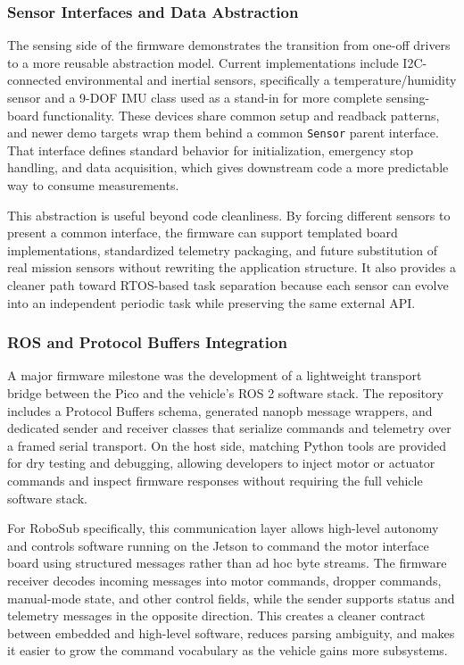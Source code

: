 \documentclass[conference]{IEEEtran}
\begin{document}
\subsubsection{Sensor Interfaces and Data Abstraction}

The sensing side of the firmware demonstrates the transition from one-off drivers to a more reusable abstraction model. Current implementations include I2C-connected environmental and inertial sensors, specifically a temperature/humidity sensor and a 9-DOF IMU class used as a stand-in for more complete sensing-board functionality. These devices share common setup and readback patterns, and newer demo targets wrap them behind a common \texttt{Sensor} parent interface. That interface defines standard behavior for initialization, emergency stop handling, and data acquisition, which gives downstream code a more predictable way to consume measurements.

This abstraction is useful beyond code cleanliness. By forcing different sensors to present a common interface, the firmware can support templated board implementations, standardized telemetry packaging, and future substitution of real mission sensors without rewriting the application structure. It also provides a cleaner path toward RTOS-based task separation because each sensor can evolve into an independent periodic task while preserving the same external API.

\subsubsection{ROS and Protocol Buffers Integration}

A major firmware milestone was the development of a lightweight transport bridge between the Pico and the vehicle's ROS 2 software stack. The repository includes a Protocol Buffers schema, generated nanopb message wrappers, and dedicated sender and receiver classes that serialize commands and telemetry over a framed serial transport. On the host side, matching Python tools are provided for dry testing and debugging, allowing developers to inject motor or actuator commands and inspect firmware responses without requiring the full vehicle software stack.

For RoboSub specifically, this communication layer allows high-level autonomy and controls software running on the Jetson to command the motor interface board using structured messages rather than ad hoc byte streams. The firmware receiver decodes incoming messages into motor commands, dropper commands, manual-mode state, and other control fields, while the sender supports status and telemetry messages in the opposite direction. This creates a cleaner contract between embedded and high-level software, reduces parsing ambiguity, and makes it easier to grow the command vocabulary as the vehicle gains more subsystems.
\end{document}

